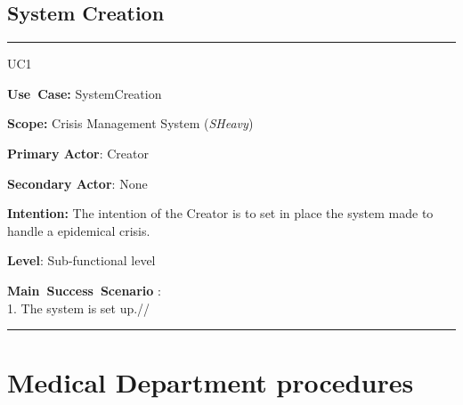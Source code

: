 \subsection{System Creation}
\vspace{0.5cm}
\hrule
\vspace{0.5cm}
\begin{lyxlist}{UC1}
\small{
\item [\textbf{Use~Case:}] SystemCreation
\item [\textbf{Scope:}] Crisis Management System (\emph{SHeavy})
\item [\textbf{Primary Actor}:] Creator
\item [\textbf{Secondary Actor}:] None
\item [\textbf{Intention:}] The intention of the Creator is to set in place the system made to handle a epidemical crisis. 
\item [\textbf{Level}:]Sub-functional level
\item [\textbf{Main~Success~Scenario}]:\\
1. The system is set up.// }
\end{lyxlist}
\hrule 
\vspace{0.5cm} 

\section{Medical Department procedures}

